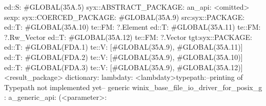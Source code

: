         ed::S: #GLOBAL(35A.5)
            syx::ABSTRACT_PACKAGE:
                an_api: <omitted>
                sexp:
                    syx::COERCED_PACKAGE:
                        #GLOBAL(35A.9)
                         src:syx::PACKAGE:
                                ed::T: #GLOBAL(35A.10) te::FM: ?.Element
                                ed::T: #GLOBAL(35A.11) te::FM: ?.Rw_Vector
                                ed::T: #GLOBAL(35A.12) te::FM: ?.Vector
                        tgt:syx::PACKAGE:
                            ed::T: #GLOBAL(FDA.1)
                             te::V:
                             [#GLOBAL(35A.9), #GLOBAL(35A.11)]
                            ed::T: #GLOBAL(FDA.2)
                             te::V:
                             [#GLOBAL(35A.9), #GLOBAL(35A.10)]
                            ed::T: #GLOBAL(FDA.3)
                             te::V:
                             [#GLOBAL(35A.9), #GLOBAL(35A.12)]
         <result_package>
dictionary:
lambdaty:
  <lambdaty>typepath:--printing of Typepath not implemented yet--
generic winix_base_file_io_driver_for_posix_g
:
a_generic_api:
(<parameter>:
